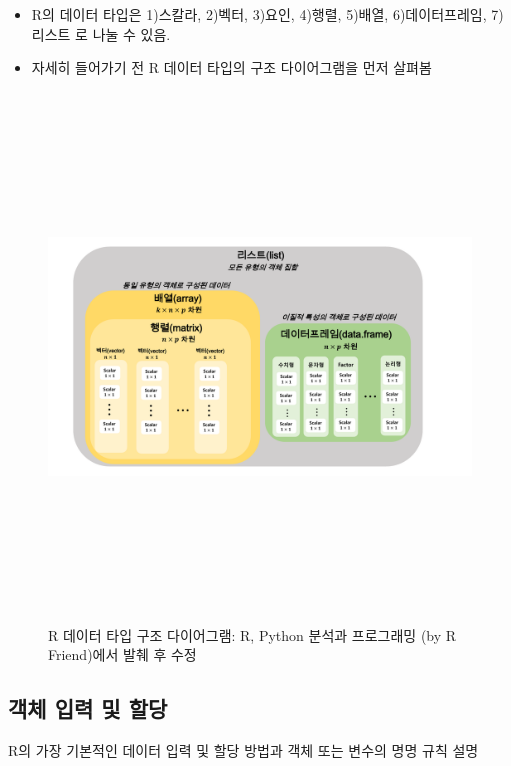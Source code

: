 \documentclass[12pt,a4paper]{book}
\providecommand{\tightlist}{%
  \setlength{\itemsep}{0pt}\setlength{\parskip}{0pt}}
\theoremstyle{definition}
\theoremstyle{definition}
\theoremstyle{definition}
\theoremstyle{remark}
\begin{document}
\begin{itemize}
\tightlist
\item
  R의 데이터 타입은 1)스칼라, 2)벡터, 3)요인, 4)행렬, 5)배열,
  6)데이터프레임, 7)리스트 로 나눌 수 있음.
\item
  자세히 들어가기 전 R 데이터 타입의 구조 다이어그램을 먼저 살펴봄
\end{itemize}

\begin{figure}[H] {
  \centering
  \includegraphics[width = 15cm, height = 14cm]{Figures/datatype-diagram}
  \caption[R 데이터 타입 구조 다이어그램]{R 데이터 타입 구조 다이어그램: R, Python 분석과 프로그래밍 (by R Friend)에서 발췌 후 수정}\label{fig:R-datatype}
} \end{figure}

\vspace{1cm}

\subsection{객체 입력 및 할당}\label{---}

R의 가장 기본적인 데이터 입력 및 할당 방법과 객체 또는 변수의 명명 규칙
설명
\end{document}
